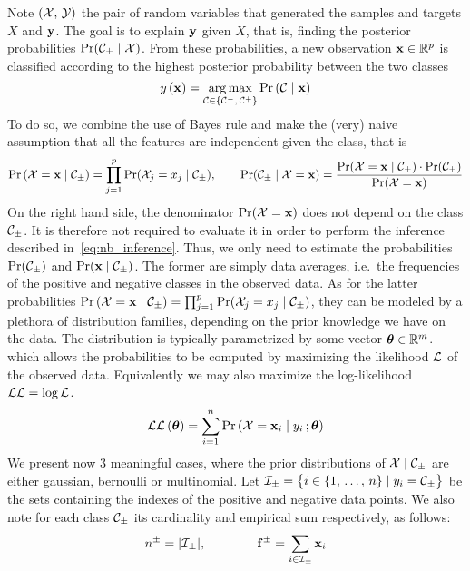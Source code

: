 Note $\left( \mathcal{X},\, \mathcal{Y} \right)$ the pair of random variables that generated the samples and targets $X$ and $\mathbf{y}$.
The goal is to explain $\mathbf{y}$ given $X$, that is, finding the posterior probabilities $\Pr(\mathcal{C}_\pm \mid \mathcal{X})$.
From these probabilities, a new observation $\mathbf{x} \in \mathbb{R}^p$ is classified according to the highest
posterior probability between the two classes
\begin{equation}\label{eq:nb_inference}
y\left( \mathbf{x} \right) = \underset{\mathcal{C} \in \left\{ \mathcal{C}^-,\, \mathcal{C}^+ \right\}}{\operatorname*{arg\,max}} \Pr\left( \mathcal{C} \mid \mathbf{x} \right)
\end{equation}
To do so, we combine the use of Bayes rule and make the (very) naive assumption that
all the features are independent given the class, that is
\begin{equation}
    \Pr\left( \mathcal{X} = \mathbf{x} \mid \mathcal{C}_\pm \right) = \prod_{j = 1}^p \Pr(\mathcal{X}_j = x_j \mid \mathcal{C}_\pm)
    ,\qquad
    \Pr(\mathcal{C}_\pm \mid \mathcal{X} = \mathbf{x}) = \frac{\Pr(\mathcal{X} = \mathbf{x} \mid \mathcal{C}_\pm) \cdot \Pr(\mathcal{C}_\pm)}{\Pr(\mathcal{X} = \mathbf{x})}
\end{equation}
On the right hand side,
the denominator $\Pr(\mathcal{X} = \mathbf{x})$ does not depend on the class $\mathcal{C}_\pm$.
It is therefore not required to evaluate it in order to perform the inference described in~\ref{eq:nb_inference}.
Thus, we only need to estimate the probabilities $\Pr(\mathcal{C}_\pm)$ and $\Pr(\mathbf{x} \mid \mathcal{C}_\pm)$.
The former are simply data averages, i.e.\ the frequencies of the positive and negative classes in the observed data.
As for the latter probabilities
$\Pr\left( \mathcal{X} = \mathbf{x} \mid \mathcal{C}_\pm \right) = \prod_{j = 1}^p \Pr(\mathcal{X}_j = x_j \mid \mathcal{C}_\pm)$,
they can be modeled by a plethora of distribution families, depending on the prior knowledge we have on the data.
The distribution is typically parametrized by some vector $\bm{\theta} \in \mathbb{R}^m$.
which allows the probabilities to be computed by maximizing the likelihood $\mathcal{L}$ of the observed data.
Equivalently we may also maximize the log-likelihood $\mathcal{L}\mathcal{L} = \log\mathcal{L}$.
\begin{equation*}
    \mathcal{L}\mathcal{L}\left( \bm{\theta} \right) = \sum_{i = 1}^n \Pr\left( \mathcal{X} = \mathbf{x}_i \mid y_i \,; \bm{\theta} \right)
\end{equation*}
We present now 3 meaningful cases, where the prior distributions of $\mathcal{X} \mid \mathcal{C}_\pm$ are either
gaussian, bernoulli or multinomial.
Let $\mathcal{I}_\pm = \big\{ i \in \left\{ 1,\, \dots,\, n \right\} \mid y_i = \mathcal{C}_\pm \big\}$ be the sets containing the
indexes of the positive and negative data points.
We also note for each class $\mathcal{C}_\pm$ its cardinality and empirical sum respectively, as follows:
\begin{equation*}
    n^\pm = | \mathcal{I}_\pm |,
    \qquad\qquad
    \mathbf{f}^\pm = \sum_{i \in \mathcal{I}_\pm} \mathbf{x}_i
\end{equation*}

